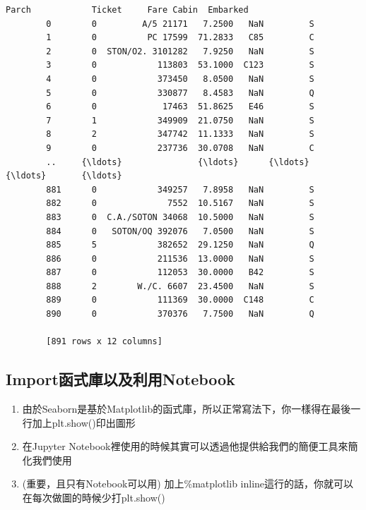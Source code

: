 \documentclass[11pt]{ctexart}
\providecommand{\tightlist}{%
      \setlength{\itemsep}{0pt}\setlength{\parskip}{0pt}}
\begin{document}
\begin{Verbatim}[commandchars=\\\{\}]
             Parch            Ticket     Fare Cabin  Embarked  
        0        0         A/5 21171   7.2500   NaN         S  
        1        0          PC 17599  71.2833   C85         C  
        2        0  STON/O2. 3101282   7.9250   NaN         S  
        3        0            113803  53.1000  C123         S  
        4        0            373450   8.0500   NaN         S  
        5        0            330877   8.4583   NaN         Q  
        6        0             17463  51.8625   E46         S  
        7        1            349909  21.0750   NaN         S  
        8        2            347742  11.1333   NaN         S  
        9        0            237736  30.0708   NaN         C  
        ..     {\ldots}               {\ldots}      {\ldots}   {\ldots}       {\ldots}  
        881      0            349257   7.8958   NaN         S  
        882      0              7552  10.5167   NaN         S  
        883      0  C.A./SOTON 34068  10.5000   NaN         S  
        884      0   SOTON/OQ 392076   7.0500   NaN         S  
        885      5            382652  29.1250   NaN         Q  
        886      0            211536  13.0000   NaN         S  
        887      0            112053  30.0000   B42         S  
        888      2        W./C. 6607  23.4500   NaN         S  
        889      0            111369  30.0000  C148         C  
        890      0            370376   7.7500   NaN         Q  
        
        [891 rows x 12 columns]
\end{Verbatim}
            
    \hypertarget{importux51fdux5f0fux5eabux4ee5ux53caux5229ux7528notebook}{%
\subsection{Import函式庫以及利用Notebook}\label{importux51fdux5f0fux5eabux4ee5ux53caux5229ux7528notebook}}

\begin{enumerate}
\def\labelenumi{\arabic{enumi}.}
\tightlist
\item
  由於Seaborn是基於Matplotlib的函式庫，所以正常寫法下，你一樣得在最後一行加上plt.show()印出圖形
\item
  在Jupyter
  Notebook裡使用的時候其實可以透過他提供給我們的簡便工具來簡化我們使用
\item
  (重要，且只有Notebook可以用) 加上\%matplotlib
  inline這行的話，你就可以在每次做圖的時候少打plt.show()
\end{enumerate}
\end{document}
